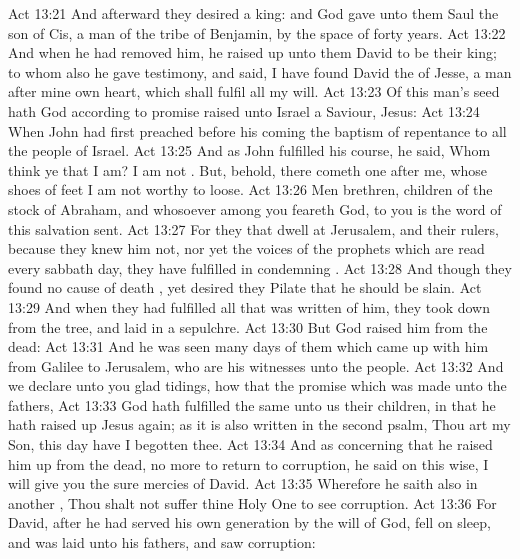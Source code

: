 \vs Act 13:21 And afterward they desired a king: and God gave unto them Saul the son of Cis, a man of the tribe of Benjamin, by the space of forty years.
\vs Act 13:22 And when he had removed him, he raised up unto them David to be their king; to whom also he gave testimony, and said, I have found David the  of Jesse, a man after mine own heart, which shall fulfil all my will.
\vs Act 13:23 Of this man's seed hath God according to  promise raised unto Israel a Saviour, Jesus:
\vs Act 13:24 When John had first preached before his coming the baptism of repentance to all the people of Israel.
\vs Act 13:25 And as John fulfilled his course, he said, Whom think ye that I am? I am not . But, behold, there cometh one after me, whose shoes of  feet I am not worthy to loose.
\vs Act 13:26 Men  brethren, children of the stock of Abraham, and whosoever among you feareth God, to you is the word of this salvation sent.
\vs Act 13:27 For they that dwell at Jerusalem, and their rulers, because they knew him not, nor yet the voices of the prophets which are read every sabbath day, they have fulfilled  in condemning .
\vs Act 13:28 And though they found no cause of death , yet desired they Pilate that he should be slain.
\vs Act 13:29 And when they had fulfilled all that was written of him, they took  down from the tree, and laid  in a sepulchre.
\vs Act 13:30 But God raised him from the dead:
\vs Act 13:31 And he was seen many days of them which came up with him from Galilee to Jerusalem, who are his witnesses unto the people.
\vs Act 13:32 And we declare unto you glad tidings, how that the promise which was made unto the fathers,
\vs Act 13:33 God hath fulfilled the same unto us their children, in that he hath raised up Jesus again; as it is also written in the second psalm, Thou art my Son, this day have I begotten thee.
\vs Act 13:34 And as concerning that he raised him up from the dead,  no more to return to corruption, he said on this wise, I will give you the sure mercies of David.
\vs Act 13:35 Wherefore he saith also in another , Thou shalt not suffer thine Holy One to see corruption.
\vs Act 13:36 For David, after he had served his own generation by the will of God, fell on sleep, and was laid unto his fathers, and saw corruption:
